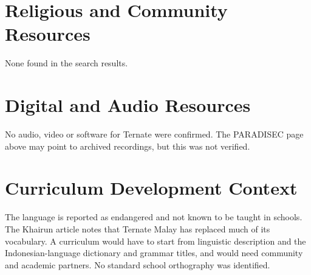 \documentclass[12pt]{article}
\begin{document}
\section{Religious and Community Resources}
None found in the search results.

\section{Digital and Audio Resources}
No audio, video or software for Ternate were confirmed. The PARADISEC page above may point to archived recordings, but this was not verified.

\section{Curriculum Development Context}
The language is reported as endangered and not known to be taught in schools. The Khairun article notes that Ternate Malay has replaced much of its vocabulary. A curriculum would have to start from linguistic description and the Indonesian-language dictionary and grammar titles, and would need community and academic partners. No standard school orthography was identified.
\end{document}
